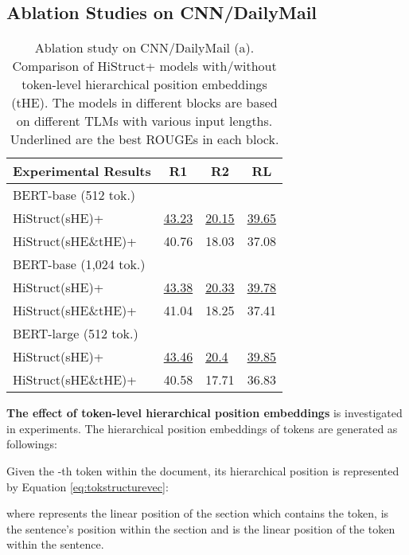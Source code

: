 \documentclass[11pt]{article}
\begin{document}
\subsection{Ablation Studies on CNN/DailyMail}
\label{subsec:Ablation studies on CNN/DailyMail}

\begin{table}[ht]
\fontsize{9}{9}
\selectfont
\centering
\begin{tabular}{@{}llll@{}}
\toprule
Experimental Results  &  \multicolumn{1}{c}{R1} & \multicolumn{1}{c}{R2} & \multicolumn{1}{c}{RL}    \\ \midrule
BERT-base (512 tok.)       \\ \midrule
HiStruct(sHE)+      & \underline{43.23} & \underline{20.15} & \underline{39.65} \\
HiStruct(sHE\&tHE)+ & 40.76 & 18.03 & 37.08 \\ \midrule
BERT-base (1,024 tok.)  & & &        \\ \midrule
HiStruct(sHE)+      & \underline{43.38} & \underline{20.33} & \underline{39.78} \\
HiStruct(sHE\&tHE)+ & 41.04 & 18.25 & 37.41 \\ \midrule
BERT-large (512 tok.) & & &         \\ \midrule
HiStruct(sHE)+      & \underline{43.46} & \underline{20.4}  & \underline{39.85} \\
HiStruct(sHE\&tHE)+ & 40.58 & 17.71 & 36.83 \\ \bottomrule
\end{tabular}
\caption[Ablation study on CNN/DailyMail (a)]{Ablation study on CNN/DailyMail (a). Comparison of HiStruct+ models with/without token-level hierarchical position embeddings (tHE). The models in different blocks are based on different TLMs with various input lengths. Underlined are the best ROUGEs in each block.}
\label{tab:cnndm_ablation_a}
\end{table}

\textbf{The effect of token-level hierarchical position embeddings} is investigated in experiments. The hierarchical position embeddings of tokens are generated as followings: 

Given the -th token within the document, its hierarchical position is represented by Equation \ref{eq:tokstructurevec}:

where  represents the linear position of the section  which contains the token,  is the sentence's position within the section and  is the linear position of the token within the sentence. 
\end{document}
